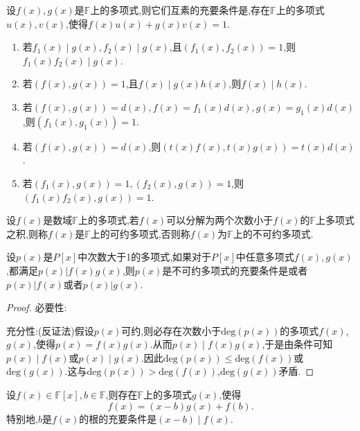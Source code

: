 \documentclass[lang=cn,newtx,10pt,scheme=chinese]{elegantbook}
\begin{document}
\begin{theorem}\label{theorem:互素的充要条件}
    设\(f(x),g(x)\)是\(\mathbb{F}\)上的多项式,则它们互素的充要条件是,存在\(\mathbb{F}\)上的多项式\(u(x),v(x)\),使得\(f(x)u(x)+g(x)v(x)=1\).
\end{theorem}

\begin{proposition}[互素多项式的性质]\label{proposition:互素多项式的性质}
\begin{enumerate}[(1)]
    \item 若\(f_1(x)\mid g(x), f_2(x)\mid g(x)\),且\((f_1(x), f_2(x)) = 1\),则\(f_1(x)f_2(x)\mid g(x)\).
    \item  若\((f(x), g(x)) = 1\),且\(f(x)\mid g(x)h(x)\),则\(f(x)\mid h(x)\).
    \item  若\((f(x), g(x)) = d(x), f(x)=f_1(x)d(x), g(x)=g_1(x)d(x)\),则\((f_1(x), g_1(x)) = 1\).
    \item  若\((f(x), g(x)) = d(x)\),则\((t(x)f(x), t(x)g(x)) = t(x)d(x)\).
    \item  若\((f_1(x), g(x)) = 1, (f_2(x), g(x)) = 1\),则\((f_1(x)f_2(x), g(x)) = 1\).
\end{enumerate}
\end{proposition}

\begin{definition}[不可约多项式的定义]\label{definition:不可约多项式的定义}
    设\(f(x)\)是数域\(\mathbb{F}\)上的多项式,若\(f(x)\)可以分解为两个次数小于\(f(x)\)的\(\mathbb{F}\)上多项式之积,则称\(f(x)\)是\(\mathbb{F}\)上的可约多项式,否则称\(f(x)\)为\(\mathbb{F}\)上的不可约多项式.
\end{definition}

\begin{theorem}\label{theorem:不可约多项式的充要条件1}
    设$p(x)$是$P[x]$中次数大于1的多项式,如果对于$P[x]$中任意多项式$f(x),g(x)$,都满足$p(x)|f(x)g(x)$,则$p(x)$是不可约多项式的充要条件是或者$p(x)|f(x)$或者$p(x)|g(x)$.
\end{theorem}
\begin{proof}
    必要性:
    
    充分性:(反证法)假设\(p(x)\)可约,则必存在次数小于\(\text{deg}(p(x))\)的多项式\(f(x)\),\(g(x)\),使得\(p(x) = f(x)g(x)\).从而\(p(x) \mid f(x)g(x)\),于是由条件可知\(p(x) \mid f(x)\)或\(p(x) \mid g(x)\).因此\(\text{deg}(p(x)) \leq \text{deg}(f(x))\)或\(\text{deg}(g(x))\).这与\(\text{deg}(p(x)) > \text{deg}(f(x))\),\(\text{deg}(g(x))\)矛盾.
\end{proof}

\begin{theorem}[余数定理]\label{theorem:余数定理}
设\(f(x)\in\mathbb{F}[x], b\in\mathbb{F}\),则存在\(\mathbb{F}\)上的多项式\(g(x)\),使得
\[
f(x)=(x - b)g(x)+f(b).
\]
特别地,\(b\)是\(f(x)\)的根的充要条件是\((x - b)\mid f(x)\).
\end{theorem}
\end{document}
